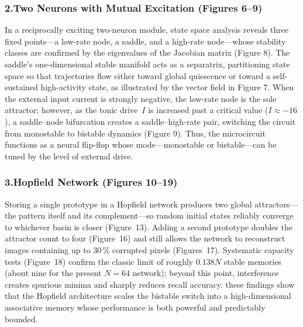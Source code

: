 \documentclass{article}
\begin{document}
\subsubsection*{2.\;Two Neurons with Mutual Excitation (Figures 6–9)}
In a reciprocally exciting two-neuron module, state space analysis reveals three fixed points—a low-rate node, a saddle, and a high-rate node—whose stability classes are confirmed by the eigenvalues of the Jacobian matrix (Figure 8). The saddle’s one-dimensional stable manifold acts as a separatrix, partitioning state space so that trajectories flow either toward global quiescence or toward a self-sustained high-activity state, as illustrated by the vector field in Figure 7. When the external input current is strongly negative, the low-rate node is the sole attractor; however, as the tonic drive~$I$ is increased past a critical value ($I \approx -16$), a saddle–node bifurcation creates a saddle–high-rate pair, switching the circuit from monostable to bistable dynamics (Figure 9). Thus, the microcircuit functions as a neural flip-flop whose mode—monostable or bistable—can be tuned by the level of external drive.


\subsubsection*{3.\;Hopfield Network (Figures 10–19)}

Storing a single prototype in a Hopfield network produces two global
attractors—the pattern itself and its complement—so random initial
states reliably converge to whichever basin is closer (Figure~13).
Adding a second prototype doubles the attractor count to four
(Figure~16) and still allows the network to reconstruct images
containing up to 30\,\% corrupted pixels (Figures~17).  Systematic
capacity tests (Figure~18) confirm the classic limit of roughly
$0.138N$ stable memories (about nine for the present $N=64$ network);
beyond this point, interference creates spurious minima and sharply
reduces recall accuracy. these findings show that the
Hopfield architecture scales the bistable switch into a high-dimensional
associative memory whose performance is both powerful and predictably
bounded.

\end{document}
